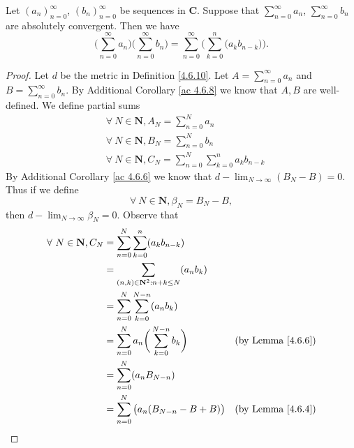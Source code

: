 \begin{additional corollary}\label{ac 4.6.9}
Let \((a_n)_{n = 0}^\infty\), \((b_n)_{n = 0}^\infty\) be sequences in \(\mathbf{C}\).
Suppose that \(\sum_{n = 0}^\infty a_n\), \(\sum_{n = 0}^\infty b_n\) are absolutely convergent.
Then we have
\[
    \bigg(\sum_{n = 0}^\infty a_n\bigg) \bigg(\sum_{n = 0}^\infty b_n\bigg) = \sum_{n = 0}^\infty \bigg(\sum_{k = 0}^n \big(a_k b_{n - k}\big)\bigg).
\]
\end{additional corollary}

\begin{proof}
    Let \(d\) be the metric in Definition \ref{4.6.10}.
    Let \(A = \sum_{n = 0}^\infty a_n\) and \(B = \sum_{n = 0}^\infty b_n\).
    By Additional Corollary \ref{ac 4.6.8} we know that \(A, B\) are well-defined.
    We define partial sums
    \begin{align*}
         & \forall\ N \in \mathbf{N}, A_N = \sum_{n = 0}^N a_n                          \\
         & \forall\ N \in \mathbf{N}, B_N = \sum_{n = 0}^N b_n                          \\
         & \forall\ N \in \mathbf{N}, C_N = \sum_{n = 0}^N \sum_{k = 0}^n a_k b_{n - k}
    \end{align*}
    By Additional Corollary \ref{ac 4.6.6} we know that \(d - \lim_{N \to \infty} (B_N - B) = 0\).
    Thus if we define
    \[
        \forall\ N \in \mathbf{N}, \beta_N = B_N - B,
    \]
    then \(d - \lim_{N \to \infty} \beta_N = 0\).
    Observe that
    \begin{align*}
        \forall\ N \in \mathbf{N}, C_N & = \sum_{n = 0}^N \sum_{k = 0}^n (a_k b_{n - k})                                                         \\
                                       & = \sum_{(n, k) \in \mathbf{N}^2 : n + k \leq N} (a_n b_k)                                               \\
                                       & = \sum_{n = 0}^N \sum_{k = 0}^{N - n} (a_n b_k)                                                         \\
                                       & = \sum_{n = 0}^N a_n \bigg(\sum_{k = 0}^{N - n} b_k\bigg)               & \text{(by Lemma \ref{4.6.6})} \\
                                       & = \sum_{n = 0}^N (a_n B_{N - n})                                                                        \\
                                       & = \sum_{n = 0}^N \big(a_n (B_{N - n} - B + B)\big)                      & \text{(by Lemma \ref{4.6.4})} \\

\end{align*}
\end{proof}
